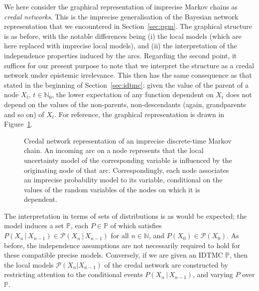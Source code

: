 \documentclass[graybox]{svmult}
\newcommand{\nats}{\mathbb{N}}
\newcommand{\natswith}{\nats_{0}}
\begin{document}
We here consider the graphical representation of imprecise Markov chains as \emph{credal networks}. This is the imprecise generalisation of the Bayesian network representation that we encountered in Section~\ref{sec:pgm}. The graphical structure is as before, with the notable differences being (i) the local models (which are here replaced with imprecise local models), and (ii) the interpretation of the independence properties induced by the arcs. Regarding the second point, it suffices for our present purpose to note that we interpret the structure as a credal network under epistemic irrelevance. This then has the same consequence as that stated in the beginning of Section~\ref{sec:idtmc}: given the value of the parent of a node $X_t$, $t\in\natswith$, the lower expectation of any function dependent on $X_t$ does not depend on the values of the non-parents, non-descendants (again, grandparents and so on) of $X_t$. For reference, the graphical representation is drawn in Figure~\ref{fig:example_markov_credal}.

\begin{figure}
\centering
{}
\caption{Credal network representation of an imprecise discrete-time Markov chain. An incoming arc on a node represents that the local uncertainty model of the corresponding variable is influenced by the originating node of that arc. Correspondingly, each node associates an imprecise probability model to its variable, conditional on the values of the random variables of the nodes on which it is dependent.}
\label{fig:example_markov_credal}
\end{figure}
The interpretation in terms of sets of distributions is as would be expected; the model induces a set $\mathbb{P}$, each $P\in\mathbb{P}$ of which satisfies $P(X_n\,\vert\,X_{n-1})\in\mathcal{P}(X_n\,\vert\,X_{n-1})$ for all $n\in\nats$, and $P(X_0)\in\mathcal{P}(X_0)$. As before, the independence assumptions are not necessarily required to hold for these compatible precise models. Conversely, if we are given an IDTMC $\mathbb{P}$, then the local models $\mathcal{P}(X_n\vert X_{n-1})$ of the credal network are constructed by restricting attention to the conditional events $P(X_{n}\,\vert\,X_{n-1})$, and varying $P$ over $\mathbb{P}$. 
\end{document}
